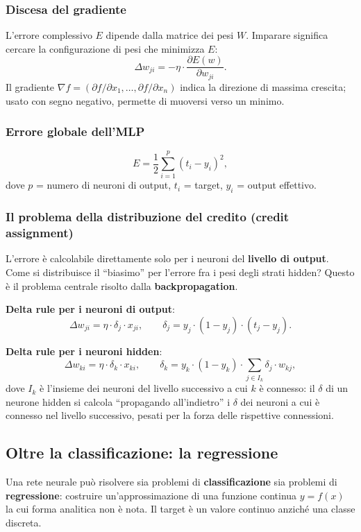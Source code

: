 \documentclass[11pt,a4paper]{report}
\begin{document}
\subsubsection*{Discesa del gradiente}

L'errore complessivo $E$ dipende dalla matrice dei pesi $W$. Imparare significa cercare la configurazione di pesi che minimizza $E$:
\[
\Delta w_{ji} = -\eta \cdot \frac{\partial E(w)}{\partial w_{ji}}.
\]
Il gradiente $\nabla f = (\partial f/\partial x_1,\dots,\partial f/\partial x_n)$ indica la direzione di massima crescita; usato con segno negativo, permette di muoversi verso un minimo.

\subsubsection*{Errore globale dell'MLP}

\[
E = \frac{1}{2} \sum_{i=1}^{p} (t_i - y_i)^2,
\]
dove $p$ = numero di neuroni di output, $t_i$ = target, $y_i$ = output effettivo.

\subsubsection*{Il problema della distribuzione del credito (credit assignment)}

L'errore è calcolabile direttamente solo per i neuroni del \textbf{livello di output}. Come si distribuisce il ``biasimo'' per l'errore fra i pesi degli strati hidden? Questo è il problema centrale risolto dalla \textbf{backpropagation}.

\textbf{Delta rule per i neuroni di output}:
\[
\Delta w_{ji} = \eta \cdot \delta_j \cdot x_{ji}, \qquad \delta_j = y_j \cdot (1-y_j) \cdot (t_j - y_j).
\]

\textbf{Delta rule per i neuroni hidden}:
\[
\Delta w_{ki} = \eta \cdot \delta_k \cdot x_{ki}, \qquad \delta_k = y_k \cdot (1-y_k) \cdot \sum_{j \in I_k} \delta_j \cdot w_{kj},
\]
dove $I_k$ è l'insieme dei neuroni del livello successivo a cui $k$ è connesso: il $\delta$ di un neurone hidden si calcola ``propagando all'indietro'' i $\delta$ dei neuroni a cui è connesso nel livello successivo, pesati per la forza delle rispettive connessioni.

\subsection*{Oltre la classificazione: la regressione}

Una rete neurale può risolvere sia problemi di \textbf{classificazione} sia problemi di \textbf{regressione}: costruire un'approssimazione di una funzione continua $y=f(x)$ la cui forma analitica non è nota. Il target è un valore continuo anziché una classe discreta.
\end{document}
